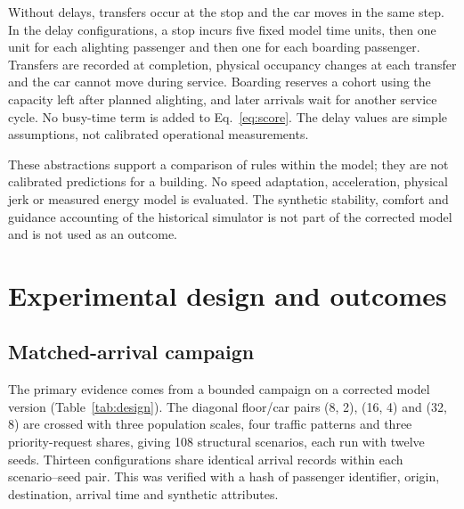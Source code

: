 Without delays, transfers occur at the stop and the car moves in the same step. In the delay configurations, a stop incurs five fixed model time units, then one unit for each alighting passenger and then one for each boarding passenger. Transfers are recorded at completion, physical occupancy changes at each transfer and the car cannot move during service. Boarding reserves a cohort using the capacity left after planned alighting, and later arrivals wait for another service cycle. No busy-time term is added to Eq.~\eqref{eq:score}. The delay values are simple assumptions, not calibrated operational measurements.

These abstractions support a comparison of rules within the model; they are not calibrated predictions for a building. No speed adaptation, acceleration, physical jerk or measured energy model is evaluated. The synthetic stability, comfort and guidance accounting of the historical simulator is not part of the corrected model and is not used as an outcome.

\section{Experimental design and outcomes}\label{experimental-design-and-outcomes}

\subsection{Matched-arrival campaign}\label{sec:design}

The primary evidence comes from a bounded campaign on a corrected model version (Table~\ref{tab:design}). The diagonal floor/car pairs (8, 2), (16, 4) and (32, 8) are crossed with three population scales, four traffic patterns and three priority-request shares, giving 108 structural scenarios, each run with twelve seeds. Thirteen configurations share identical arrival records within each scenario--seed pair. This was verified with a hash of passenger identifier, origin, destination, arrival time and synthetic attributes.

